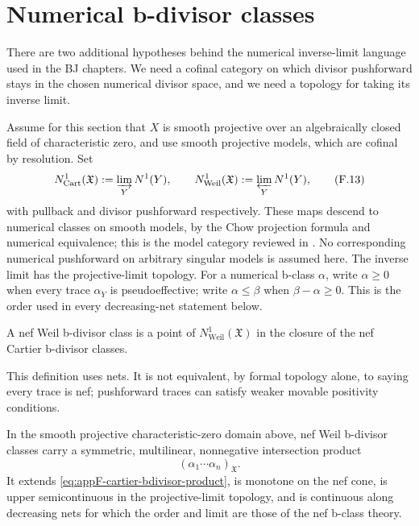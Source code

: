 \section{Numerical b-divisor classes}
\label{sec:appF-numerical-bclasses}

There are two additional hypotheses behind the numerical inverse-limit
language used in the BJ chapters.
We need a cofinal category on which divisor pushforward stays in the chosen
numerical divisor space, and we need a topology for taking its inverse
limit.

Assume for this section that \(X\) is smooth projective over an
algebraically closed field of characteristic zero, and use smooth projective
models, which are cofinal by resolution.
Set
\[
 N^1_{\mathrm{Cart}}(\mathfrak X)
 :=\varinjlim_YN^1(Y),\qquad
 N^1_{\mathrm{Weil}}(\mathfrak X)
 :=\varprojlim_YN^1(Y),
\tag{F.13}\label{eq:appF-numerical-limits}
\]
with pullback and divisor pushforward respectively.
These maps descend to numerical classes on smooth models, by the Chow
projection formula and numerical equivalence; this is the model category
reviewed in \cite[Sections~1.1--1.2]{DF20}.  No corresponding numerical
pushforward on arbitrary singular models is assumed here.
The inverse limit has the projective-limit topology.
For a numerical b-class \(\alpha\), write \(\alpha\geq0\) when every
trace \(\alpha_Y\) is pseudoeffective; write \(\alpha\leq\beta\) when
\(\beta-\alpha\geq0\).  This is the order used in every decreasing-net
statement below.

\begin{definition}
\label{def:appF-nef-weil-class}
A nef Weil b-divisor class is a point of
\(N^1_{\mathrm{Weil}}(\mathfrak X)\) in the closure of the nef Cartier
b-divisor classes.
\end{definition}

This definition uses nets.
It is not equivalent, by formal topology alone, to saying every trace is
nef; pushforward traces can satisfy weaker movable positivity conditions.

\begin{theorem}\label{thm:appF-df-nef-intersection}
In the smooth projective characteristic-zero domain above, nef Weil
b-divisor classes carry a symmetric, multilinear, nonnegative intersection
product
\[
                      (\alpha_1\cdots\alpha_n)_{\mathfrak X}.
\tag{F.14}\label{eq:appF-df-product}
\]
It extends \eqref{eq:appF-cartier-bdivisor-product}, is monotone on the nef
cone, is upper semicontinuous in the projective-limit topology, and is
continuous along decreasing nets for which the order and limit are those of
the nef b-class theory.
\end{theorem}

